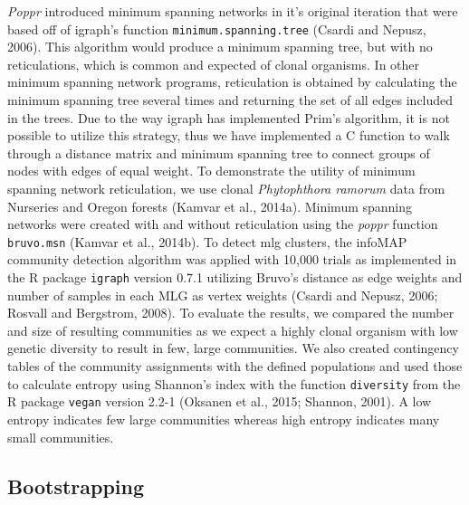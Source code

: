 \documentclass{frontiersSCNS} %
\begin{document}
\emph{Poppr} introduced minimum spanning networks in it's original
iteration that were based off of igraph's function
\texttt{minimum.spanning.tree} (Csardi and Nepusz, 2006). This algorithm
would produce a minimum spanning tree, but with no reticulations, which
is common and expected of clonal organisms. In other minimum spanning
network programs, reticulation is obtained by calculating the minimum
spanning tree several times and returning the set of all edges included
in the trees. Due to the way igraph has implemented Prim's algorithm, it
is not possible to utilize this strategy, thus we have implemented a C
function to walk through a distance matrix and minimum spanning tree to
connect groups of nodes with edges of equal weight. To demonstrate the
utility of minimum spanning network reticulation, we use clonal
\emph{Phytophthora ramorum} data from Nurseries and Oregon forests
(Kamvar et al., 2014a). Minimum spanning networks were created with and
without reticulation using the \emph{poppr} function \texttt{bruvo.msn}
(Kamvar et al., 2014b). To detect mlg clusters, the infoMAP community
detection algorithm was applied with 10,000 trials as implemented in the
R package \texttt{igraph} version 0.7.1 utilizing Bruvo's distance as
edge weights and number of samples in each MLG as vertex weights (Csardi
and Nepusz, 2006; Rosvall and Bergstrom, 2008). To evaluate the results,
we compared the number and size of resulting communities as we expect a
highly clonal organism with low genetic diversity to result in few,
large communities. We also created contingency tables of the community
assignments with the defined populations and used those to calculate
entropy using Shannon's index with the function \texttt{diversity} from
the R package \texttt{vegan} version 2.2-1 (Oksanen et al., 2015;
Shannon, 2001). A low entropy indicates few large communities whereas
high entropy indicates many small communities.

\subsection*{Bootstrapping}\label{bootstrapping}
\end{document}
